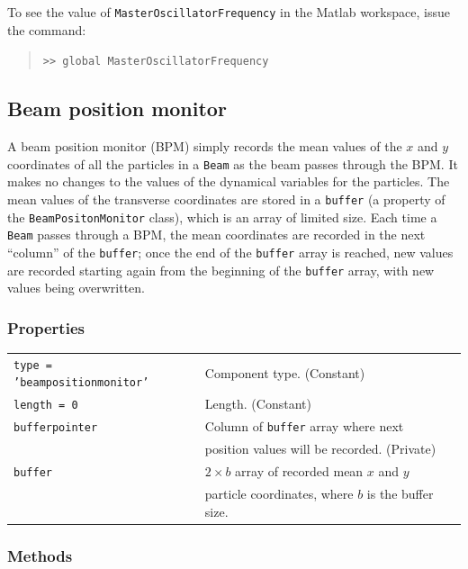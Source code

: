 \documentclass[11pt,twoside,a4paper]{article}
\begin{document}
To see the value of \texttt{MasterOscillatorFrequency} in the Matlab workspace,
issue the command:
\begin{quote}
\texttt{>> global MasterOscillatorFrequency}
\end{quote}


\subsection{Beam position monitor}
A beam position monitor (BPM) simply records the mean values of the $x$ and $y$
coordinates of all the particles in a \texttt{Beam} as the beam passes through
the BPM.  It makes no changes to the values of the dynamical variables for the
particles.  The mean values of the transverse coordinates are stored in a
\texttt{buffer} (a property of the \texttt{BeamPositonMonitor} class), which is
an array of limited size.  Each time a \texttt{Beam} passes through a BPM, the
mean coordinates are recorded in the next ``column'' of the \texttt{buffer}; once
the end of the \texttt{buffer} array is reached, new values are recorded starting
again from the beginning of the \texttt{buffer} array, with new values being
overwritten.

\subsubsection{Properties}

\begin{tabular}{|l|l|}
\hline
\texttt{type = 'beampositionmonitor'} & Component type.  (Constant)   \\
\texttt{length = 0}        & Length.  (Constant)           \\
\texttt{bufferpointer}     & Column of \texttt{buffer} array where next \\
                           & position values will be recorded. (Private) \\
\texttt{buffer}            & $2\times b$ array of recorded mean $x$ and $y$ \\
                           & particle coordinates, where $b$ is the buffer size. \\
\hline
\end{tabular}
\vspace{0.2in}

\subsubsection{Methods}
\end{document}
